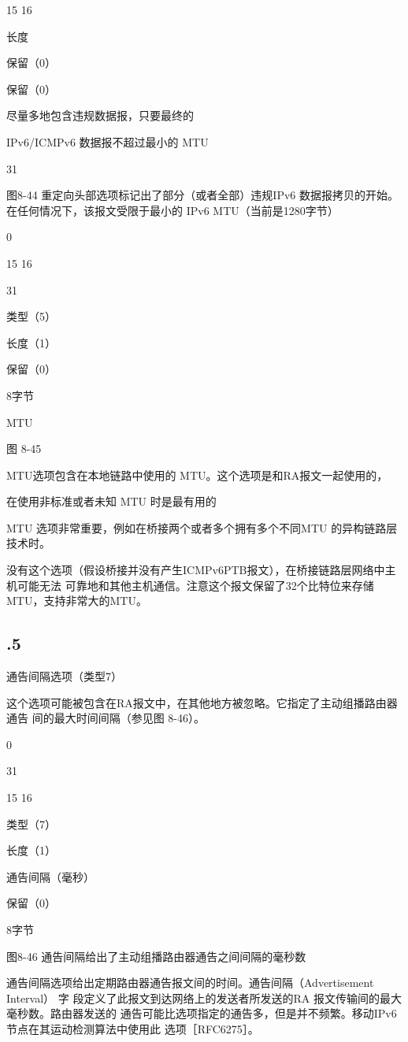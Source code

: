15 16

长度

保留（0）

保留（0）

尽量多地包含违规数据报，只要最终的

IPv6/ICMPv6 数据报不超过最小的 MTU

31

图8-44 重定向头部选项标记出了部分（或者全部）违规IPv6 数据报拷贝的开始。
在任何情况下，该报文受限于最小的 IPv6 MTU（当前是1280字节）

0

15 16

31

类型（5）

长度（1）

保留（0）

8字节

MTU

图 8-45

MTU选项包含在本地链路中使用的 MTU。这个选项是和RA报文一起使用的，

在使用非标准或者未知 MTU 时是最有用的

MTU 选项非常重要，例如在桥接两个或者多个拥有多个不同MTU 的异构链路层技术时。

没有这个选项（假设桥接并没有产生ICMPv6PTB报文），在桥接链路层网络中主机可能无法
可靠地和其他主机通信。注意这个报文保留了32个比特位来存储 MTU，支持非常大的MTU。
\subsection{.5}
通告间隔选项（类型7）

这个选项可能被包含在RA报文中，在其他地方被忽略。它指定了主动组播路由器通告
间的最大时间间隔（参见图 8-46）。

0

31

15 16

类型（7）

长度（1）

通告间隔（毫秒）

保留（0）

8字节

图8-46 通告间隔给出了主动组播路由器通告之间间隔的毫秒数

通告间隔选项给出定期路由器通告报文间的时间。通告间隔（Advertisement Interval） 字
段定义了此报文到达网络上的发送者所发送的RA 报文传输间的最大毫秒数。路由器发送的
通告可能比选项指定的通告多，但是并不频繁。移动IPv6节点在其运动检测算法中使用此
选项［RFC6275］。

